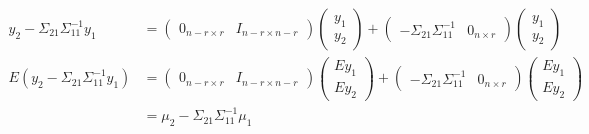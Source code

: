 \documentclass[a4paper]{article}
\begin{document}
\begin{align*}
y_2 - \Sigma_{21}\Sigma_{11}^{-1}y_1 &= \begin{pmatrix} 0_{n-r \times r} & I_{n-r \times n-r} \end{pmatrix} \begin{pmatrix}y_1 \\ y_2\end{pmatrix} + \begin{pmatrix} -\Sigma_{21}\Sigma_{11}^{-1} & 0_{n \times r}\end{pmatrix}\begin{pmatrix}y_1 \\ y_2\end{pmatrix} \\
E(y_2 - \Sigma_{21}\Sigma_{11}^{-1}y_1) &= \begin{pmatrix} 0_{n-r \times r} & I_{n-r \times n-r} \end{pmatrix} \begin{pmatrix}Ey_1\\ Ey_2 \end{pmatrix} + \begin{pmatrix} -\Sigma_{21}\Sigma_{11}^{-1} & 0_{n \times r}\end{pmatrix}\begin{pmatrix}Ey_1 \\ Ey_2\end{pmatrix}\\
&= \mu_2 - \Sigma_{21}\Sigma_{11}^{-1}\mu_1
\end{align*}
\end{document}
